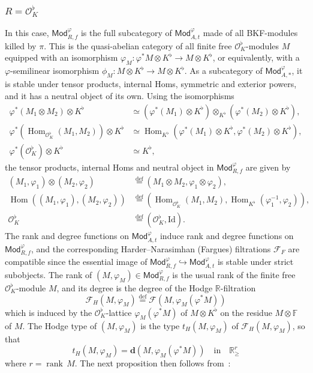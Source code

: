 \documentclass[11pt]{article}
\theoremstyle{definition}
\numberwithin{equation}{section}
\numberwithin{figure}{section}
\numberwithin{table}{section}
\newcommand{\Mod}{\mathsf{Mod}}
\DeclareMathOperator{\Hom}{Hom}
\DeclareMathOperator{\rank}{rank}
\newcommand{\eqd}{\stackrel{\mathrm{def}}{=}}
\begin{document}
\subsubsection{\texorpdfstring{$R=\mathcal{O}_{K}^{\flat}$}{R=OK flat}}\label{subsec:RisOkflat}

In this case, $\Mod_{R,f}^{\varphi}$ is the full subcategory of $\Mod_{A,t}^{\varphi}$ made of all BKF-modules killed by $\pi$. This is the quasi-abelian category of all finite free $\mathcal{O}_{K}^{\flat}$-modules $M$ equipped with an isomorphism $\varphi_{M}:\varphi^{\ast}M\otimes K^{\flat}\rightarrow M\otimes K^{\flat}$, or equivalently, with a $\varphi$-semilinear isomorphism $\phi_{M}:M\otimes K^{\flat}\rightarrow M\otimes K^{\flat}$. As a subcategory of $\Mod_{A,\ast}^{\varphi}$, it is stable under tensor products, internal Homs, symmetric and exterior powers, and it has a neutral object of its own. Using the isomorphisms
\begin{align*}
\varphi^{\ast}(M_{1}\otimes M_{2})\otimes K^{\flat} & \simeq \left(\varphi^{\ast}(M_{1})\otimes K^{\flat}\right)\otimes_{K^{\flat}}\left(\varphi^{\ast}(M_{2})\otimes K^{\flat}\right),\\
\varphi^{\ast}\left(\Hom_{\mathcal{O}_{K}^{\flat}}(M_{1},M_{2})\right)\otimes K^{\flat} & \simeq \Hom_{K^{\flat}}\left(\varphi^{\ast}(M_{1})\otimes K^{\flat},\varphi^{\ast}(M_{2})\otimes K^{\flat}\right),\\
\varphi^{\ast}(\mathcal{O}_{K}^{\flat})\otimes K^{\flat} & \simeq K^{\flat},
\end{align*}
the tensor products, internal Homs and neutral object in $\Mod_{R,f}^{\varphi}$ are given by
\begin{align*}
(M_{1},\varphi_{1})\otimes(M_{2},\varphi_{2}) & \eqd \left(M_{1}\otimes M_{2},\varphi_{1}\otimes\varphi_{2}\right),\\
\Hom\left((M_{1},\varphi_{1}),(M_{2},\varphi_{2})\right) & \eqd \left(\Hom_{\mathcal{O}_{K}^{\flat}}(M_{1},M_{2}),\Hom_{K^{\flat}}(\varphi_{1}^{-1},\varphi_{2})\right),\\
\mathcal{O}_{K}^{\flat} & \eqd (\mathcal{O}_{K}^{\flat},\mathrm{Id}).
\end{align*}
The rank and degree functions on $\Mod_{A,t}^{\varphi}$ induce rank and degree functions on $\Mod_{R,f}^{\varphi}$, and the corresponding Harder--Narasimhan (Fargues) filtrations $\mathcal{F}_{F}$ are compatible since the essential image of $\Mod_{R,f}^{\varphi}\hookrightarrow\Mod_{A,t}^{\varphi}$ is stable under strict subobjects. The rank of $(M,\varphi_{M})\in\Mod_{R,f}^{\varphi}$ is the usual rank of the finite free $\mathcal{O}_{K}^{\flat}$-module $M$, and its degree is the degree of the Hodge $\mathbb{R}$-filtration
\[
\mathcal{F}_{H}(M,\varphi_{M})\eqd\mathcal{F}\left(M,\varphi_{M}\left(\varphi^{\ast}M\right)\right)
\]
which is induced by the $\mathcal{O}_{K}^{\flat}$-lattice $\varphi_{M}(\varphi^{\ast}M)$ of $M\otimes K^{\flat}$ on the residue $M\otimes\mathbb{F}$ of $M$. The Hodge type of $(M,\varphi_{M})$ is the type $t_{H}(M,\varphi_{M})$ of $\mathcal{F}_{H}(M,\varphi_{M})$, so that
\[
t_{H}(M,\varphi_{M})=\mathbf{d}\left(M,\varphi_{M}(\varphi^{\ast}M)\right)\quad\text{in}\quad\mathbb{R}_{\geq}^{r}
\]
where $r=\rank\,M$. The next proposition then follows from~\cite[\S 5.3]{Co16}:
\end{document}
